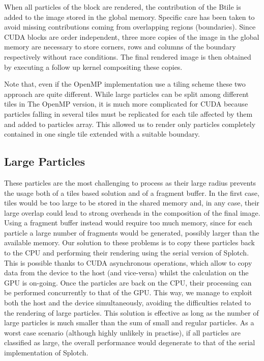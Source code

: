 \documentclass[1p]{elsarticle}
\begin{document}
When all particles of the block are rendered, the contribution of the Btile is added to the image stored in the global memory. Specific care has been taken to avoid missing contributions coming
from overlapping regions (boundaries). Since CUDA blocks are order independent, three more copies of the image in the global memory are necessary to store corners, rows and columns of the boundary respectively without race conditions. The final rendered image is then obtained by executing a follow up kernel compositing these copies.

Note that, even if the OpenMP implementation use a tiling scheme these two approach are quite different. While large particles can be split among different tiles in The OpenMP version, it is much more complicated for CUDA because particles falling in several tiles must be replicated for each tile affected by them and added to particles array. This allowed us to render only particles completely contained in one single tile extended with a suitable boundary. 

\subsection{Large Particles}
\label{sec:largeparticles}
These particles are the most challenging to process as their large
radius prevents the usage both of a tiles based solution and of a fragment buffer.
In the first case, tiles would be too large to be stored in the shared memory
and, in any case, their large overlap could lead to strong overheads in the composition of the
final image. Using a fragment buffer instead would require too much memory, since
for each particle a large number of fragments would be generated, possibly
larger than the available memory. Our solution to these problems is to copy these particles back to the CPU and performing their rendering
using the serial version of Splotch. This is possible thanks to CUDA asynchronous
operations, which allow to copy data from the device to the host (and vice-versa)
whilst the calculation on the GPU is on-going. Once the particles are back on the CPU,
their processing can be performed concurrently to that of the GPU.  
This way, we manage to exploit both the host and the device simultaneously, avoiding the difficulties related to the rendering of large
particles. This solution is effective as long as the number of large particles
is much smaller than the sum of small and regular particles. As a worst case scenario (although highly unlikely in practise), if all particles are classified as large, the overall performance would degenerate to that of the serial implementation of Splotch.
\end{document}
